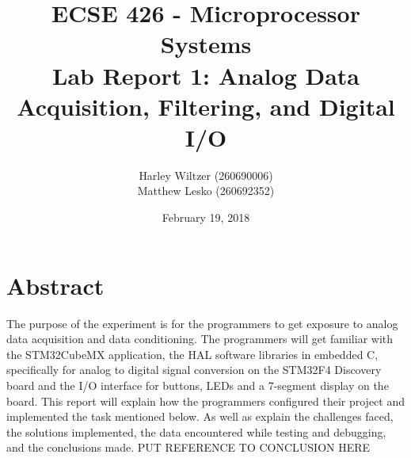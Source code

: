 \documentclass[12pt]{report}
\title{ECSE 426 - Microprocessor Systems\\Lab Report 1: Analog Data Acquisition, Filtering, and
Digital I/O}
\author{Harley Wiltzer (260690006)\\Matthew Lesko (260692352)}
\date{February 19, 2018}
\begin{document}
\maketitle
\tableofcontents
\let\clearpage\relax
\listoffigures
\let\clearpage\relax
\listoftables
\newpage
\section{Abstract}
The purpose of the experiment is for the programmers to get exposure to analog data acquisition and data conditioning. The programmers will get familiar with the STM32CubeMX application, the HAL software libraries in embedded C, specifically for analog to digital signal conversion on the STM32F4 Discovery board and the I/O interface for buttons, LEDs and a 7-segment display on the board. This report will explain how the programmers configured their project and implemented the task mentioned below. As well as explain the challenges faced, the solutions implemented, the data encountered while testing and debugging, and the conclusions made. PUT REFERENCE TO CONCLUSION HERE
\end{document}
